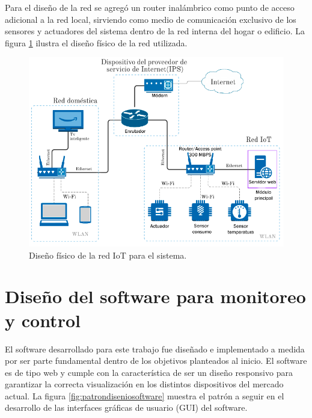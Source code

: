 Para el diseño de la red se agregó un router inalámbrico como punto de acceso adicional a la red local, sirviendo como medio de comunicación exclusivo de los sensores y actuadores del sistema dentro de la red interna del hogar o edificio. La figura \ref{fig:diagramared} ilustra el diseño físico de la red utilizada.
\vspace{0.5cm}
\begin{figure}[htpb]
\centering 
\includegraphics[width=1.0\textwidth]{./Figures/rediot2.png}
\caption{Diseño físico de la red IoT para el sistema.}
\label{fig:diagramared}
\end{figure}
\section{Diseño del software para monitoreo y control}

El software desarrollado para este trabajo fue diseñado e implementado a medida por ser parte fundamental dentro de los objetivos planteados al inicio. El software es de tipo web y cumple con la característica de ser un diseño responsivo para garantizar la correcta visualización en los distintos dispositivos del mercado actual. La figura \ref{fig:patrondiseniosoftware} muestra el patrón a seguir en el desarrollo de las interfaces gráficas de usuario (GUI) del software.

